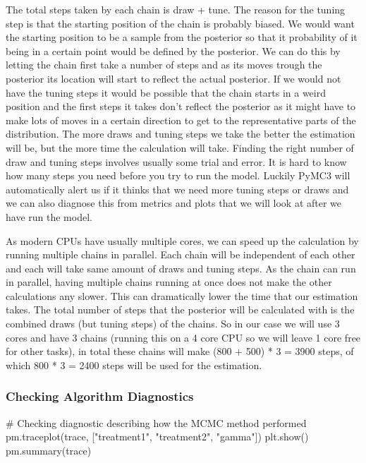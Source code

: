 \documentclass[12pt,a4paper,leqno]{report}
\theoremstyle{plain}
\theoremstyle{definition}
\theoremstyle{remark}
\begin{document}
The total steps taken by each chain is draw + tune. The reason for the tuning step is
that the starting position of the chain is probably biased. We would want the starting
position to be a sample from the posterior so that it probability of it being in a certain
point would be defined by the posterior. We can do this by letting the chain first take
a number of steps and as its moves trough the posterior its location will start to
reflect the actual posterior. If we would not have the tuning steps it would be possible
that the chain starts in a weird position and the first steps it takes don't reflect the
posterior as it might have to make lots of moves in a certain direction to get to the
representative parts of the distribution. The more draws and tuning steps we take the
better the estimation will be, but the more time the calculation will take. Finding the
right number of draw and tuning steps involves usually some trial and error. It is
hard to know how many steps you need before you try to run the model. Luckily PyMC3 will
automatically alert us if it thinks that we need more tuning steps or draws and we can
also diagnose this from metrics and plots that we will look at after we have run the
model.

As modern CPUs have usually multiple cores, we can speed up the calculation by running
multiple chains in parallel. Each chain will be independent of each other and each will
take same amount of draws and tuning steps. As the chain can run in parallel, having
multiple chains running at once does not make the other calculations any slower. This can
dramatically lower the time that our estimation takes. The total number of steps that
the posterior will be calculated with is the combined draws (but tuning steps) of the
chains. So in our case we will use 3 cores and have 3 chains (running this on a 4 core
CPU so we will leave 1 core free for other tasks), in total these chains will make (800 +
500) * 3 = 3900 steps, of which 800 * 3 = 2400 steps will be used for the estimation.


\subsubsection{Checking Algorithm Diagnostics}

\bigskip
\begin{pyverbatim}
# Checking diagnostic describing how the MCMC method performed
pm.traceplot(trace, ["treatment1", "treatment2", "gamma"])
plt.show()
pm.summary(trace)
\end{pyverbatim}
\bigskip
\end{document}
